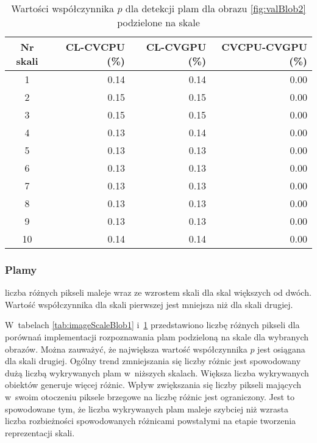 \begin{center}
\begin{table}
\centering
\caption{Wartości współczynnika $ p $ dla detekcji plam dla obrazu \ref{fig:valBlob2} podzielone na skale}
\label{tab:imageScaleBlob2}
\begin{tabular}{|c|r|r|r|}
\hline
Nr skali & CL-CVCPU (\%) & CL-CVGPU (\%) & CVCPU-CVGPU (\%) \\ \hline
1        & 0.14     & 0.14     & 0.00       \\ \hline
2        & 0.15     & 0.15     & 0.00        \\ \hline
3        & 0.15     & 0.15     & 0.00       \\ \hline
4        & 0.13     & 0.14     & 0.00       \\ \hline
5        & 0.13     & 0.13     & 0.00       \\ \hline
6        & 0.13     & 0.13     & 0.00       \\ \hline
7        & 0.13     & 0.13     & 0.00       \\ \hline
8        & 0.13     & 0.13     & 0.00       \\ \hline
9        & 0.13     & 0.13     & 0.00       \\ \hline
10       & 0.14     & 0.14     & 0.00       \\ \hline
\end{tabular}
\end{table}
\end{center}

\subsubsection{Plamy}
\label{subsubsec:plamyTabele}

liczba różnych pikseli maleje wraz ze wzrostem skali dla skal większych od dwóch. Wartość współczynnika dla skali pierwszej jest mniejsza niż dla skali drugiej. 

W~tabelach \ref{tab:imageScaleBlob1} i~\ref{tab:imageScaleBlob2} przedstawiono liczbę różnych pikseli dla porównań implementacji rozpoznawania plam podzieloną na skale dla wybranych obrazów. Można zauważyć, że największa wartość współczynnika $ p $ jest osiągana dla skali drugiej. Ogólny trend zmniejszania się liczby różnic jest spowodowany dużą liczbą wykrywanych plam w~niższych skalach. Większa liczba wykrywanych obiektów generuje więcej różnic. Wpływ zwiększania się liczby pikseli mających w~swoim otoczeniu piksele brzegowe na liczbę różnic jest ograniczony. Jest to spowodowane tym, że liczba wykrywanych plam maleje szybciej niż wzrasta liczba rozbieżności spowodowanych różnicami powstałymi na etapie tworzenia reprezentacji skali.

